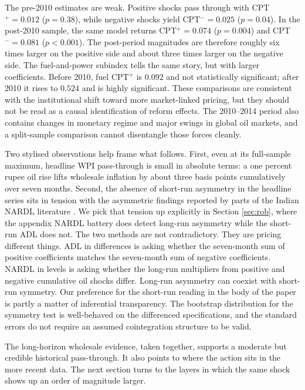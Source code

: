 \documentclass[11pt,a4paper]{article}
\begin{document}
The pre-2010 estimates are weak. Positive shocks pass through with CPT$^+ = 0.012$ ($p = 0.38$), while negative shocks yield CPT$^- = 0.025$ ($p = 0.04$). In the post-2010 sample, the same model returns CPT$^+ = 0.074$ ($p = 0.004$) and CPT$^- = 0.081$ ($p < 0.001$). The post-period magnitudes are therefore roughly six times larger on the positive side and about three times larger on the negative side. The fuel-and-power subindex tells the same story, but with larger coefficients. Before 2010, fuel CPT$^+$ is $0.092$ and not statistically significant; after 2010 it rises to $0.524$ and is highly significant. These comparisons are consistent with the institutional shift toward more market-linked pricing, but they should not be read as a causal identification of reform effects. The 2010--2014 period also contains changes in monetary regime and major swings in global oil markets, and a split-sample comparison cannot disentangle those forces cleanly.

Two stylised observations help frame what follows. First, even at its full-sample maximum, headline WPI pass-through is small in absolute terms: a one percent rupee oil rise lifts wholesale inflation by about three basis points cumulatively over seven months. Second, the absence of short-run asymmetry in the headline series sits in tension with the asymmetric findings reported by parts of the Indian NARDL literature \citep{abubakar2018,suresh2026}. We pick that tension up explicitly in Section \ref{sec:rob}, where the appendix NARDL battery does detect long-run asymmetry while the short-run ADL does not. The two methods are not contradictory. They are pricing different things. ADL in differences is asking whether the seven-month sum of positive coefficients matches the seven-month sum of negative coefficients. NARDL in levels is asking whether the long-run multipliers from positive and negative cumulative oil shocks differ. Long-run asymmetry can coexist with short-run symmetry. Our preference for the short-run reading in the body of the paper is partly a matter of inferential transparency. The bootstrap distribution for the symmetry test is well-behaved on the differenced specifications, and the standard errors do not require an assumed cointegration structure to be valid.

The long-horizon wholesale evidence, taken together, supports a moderate but credible historical pass-through. It also points to where the action sits in the more recent data. The next section turns to the layers in which the same shock shows up an order of magnitude larger.
\end{document}

